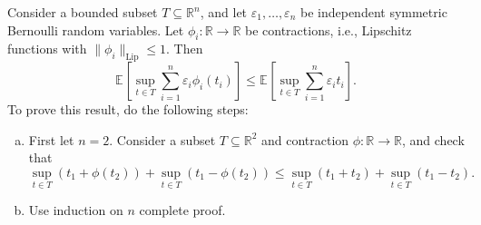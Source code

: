 \begin{problem*}[Exercise 6.7.7]\label{ex6.7.7}
	Consider a bounded subset \(T \subseteq \mathbb{R} ^n\), and let \(\varepsilon _1, \dots, \varepsilon _n \) be independent symmetric Bernoulli random variables. Let \(\phi _i \colon \mathbb{R} \to \mathbb{R} \) be contractions, i.e., Lipschitz functions with \(\lVert \phi _i \rVert _{\mathrm{Lip} } \leq 1\). Then
	\[
		\mathbb{E}_{}\left[\sup _{t \in T} \sum_{i=1}^{n} \varepsilon _i \phi _i(t_i)\right]
		\leq \mathbb{E}_{}\left[\sup _{t \in T} \sum_{i=1}^{n} \varepsilon _i t_i\right] .
	\]
	To prove this result, do the following steps:
	\begin{enumerate}[(a)]
		\item\label{ex6.7.7:a} First let \(n = 2\). Consider a subset \(T \subseteq \mathbb{R} ^2\) and contraction \(\phi \colon \mathbb{R} \to \mathbb{R} \), and check that
		      \[
			      \sup _{t \in T} (t_1 + \phi (t_2)) + \sup _{t \in T} (t_1 - \phi (t_2))
			      \leq \sup _{t \in T} (t_1 + t_2) + \sup _{t \in T} (t_1 - t_2).
		      \]
		\item\label{ex6.7.7:b} Use induction on \(n\) complete proof.
	\end{enumerate}
\end{problem*}
